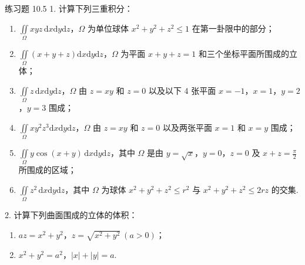 \begin{exblock}{练习题 10.5}
1. 计算下列三重积分：
\begin{enumerate}
  \item $\displaystyle \iint \limits_{\Omega} x y z \, \mathrm{d}x \mathrm{d}y \mathrm{d}z$，$\Omega$ 为单位球体 $x^2 + y^2 + z^2 \leqslant 1$ 在第一卦限中的部分；
  \item $\displaystyle \iint \limits_{\Omega} (x + y + z) \mathrm{d}x \mathrm{d}y \mathrm{d}z$，$\Omega$ 为平面 $x + y + z = 1$ 和三个坐标平面所围成的立体；
  \item $\displaystyle \iint \limits_{\Omega} z \, \mathrm{d}x \mathrm{d}y \mathrm{d}z$，$\Omega$ 由 $z = xy$ 和 $z = 0$ 以及以下 4 张平面 $x = -1$，$x = 1$，$y = 2$，$y = 3$ 围成；
  \item $\displaystyle \iint \limits_{\Omega} x y^2 z^3 \mathrm{d}x \mathrm{d}y \mathrm{d}z$，$\Omega$ 由 $z = xy$ 和 $z = 0$ 以及两张平面 $x = 1$ 和 $x = y$ 围成；
  \item $\displaystyle \iint \limits_{\Omega} y \cos(x + y) \, \mathrm{d}x \mathrm{d}y \mathrm{d}z$，其中 $\Omega$ 是由 $y = \sqrt{x}$，$y = 0$，$z = 0$ 及 $x + z = \frac{\pi}{2}$ 所围成的区域；
  \item $\displaystyle \iint \limits_{\Omega} z^2 \, \mathrm{d}x \mathrm{d}y \mathrm{d}z$，其中 $\Omega$ 为球体 $x^2 + y^2 + z^2 \leqslant r^2$ 与 $x^2 + y^2 + z^2 \leqslant 2rz$ 的交集.
\end{enumerate}

2. 计算下列曲面围成的立体的体积：
\begin{enumerate}
  \item $a z = x^2 + y^2$，$z = \sqrt{x^2 + y^2}\ (a > 0)$；
  \item $x^2 + y^2 = a^2$，$|x| + |y| = a$.
\end{enumerate}


\end{exblock}
